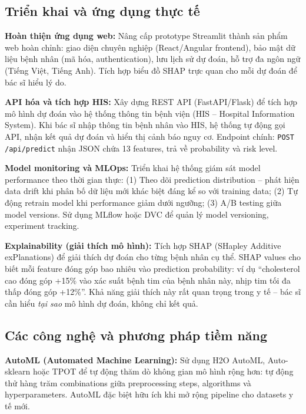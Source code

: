 \subsection{Triển khai và ứng dụng thực tế}

\textbf{Hoàn thiện ứng dụng web:} Nâng cấp prototype Streamlit thành sản phẩm web hoàn chỉnh: giao diện chuyên nghiệp (React/Angular frontend), bảo mật dữ liệu bệnh nhân (mã hóa, authentication), lưu lịch sử dự đoán, hỗ trợ đa ngôn ngữ (Tiếng Việt, Tiếng Anh). Tích hợp biểu đồ SHAP trực quan cho mỗi dự đoán để bác sĩ hiểu lý do.

\textbf{API hóa và tích hợp HIS:} Xây dựng REST API (FastAPI/Flask) để tích hợp mô hình dự đoán vào hệ thống thông tin bệnh viện (HIS -- Hospital Information System). Khi bác sĩ nhập thông tin bệnh nhân vào HIS, hệ thống tự động gọi API, nhận kết quả dự đoán và hiển thị cảnh báo nguy cơ. Endpoint chính: \texttt{POST /api/predict} nhận JSON chứa 13 features, trả về probability và risk level.

\textbf{Model monitoring và MLOps:} Triển khai hệ thống giám sát model performance theo thời gian thực: (1) Theo dõi prediction distribution -- phát hiện data drift khi phân bố dữ liệu mới khác biệt đáng kể so với training data; (2) Tự động retrain model khi performance giảm dưới ngưỡng; (3) A/B testing giữa model versions. Sử dụng MLflow hoặc DVC để quản lý model versioning, experiment tracking.

\textbf{Explainability (giải thích mô hình):} Tích hợp SHAP (SHapley Additive exPlanations) \cite{pedregosa2011scikit} để giải thích dự đoán cho từng bệnh nhân cụ thể. SHAP values cho biết mỗi feature đóng góp bao nhiêu vào prediction probability: ví dụ ``cholesterol cao đóng góp +15\% vào xác suất bệnh tim của bệnh nhân này, nhịp tim tối đa thấp đóng góp +12\%''. Khả năng giải thích này rất quan trọng trong y tế -- bác sĩ cần hiểu \textit{tại sao} mô hình dự đoán, không chỉ kết quả.

\subsection{Các công nghệ và phương pháp tiềm năng}

\textbf{AutoML (Automated Machine Learning):} Sử dụng H2O AutoML, Auto-sklearn hoặc TPOT để tự động thăm dò không gian mô hình rộng hơn: tự động thử hàng trăm combinations giữa preprocessing steps, algorithms và hyperparameters. AutoML đặc biệt hữu ích khi mở rộng pipeline cho datasets y tế mới.

